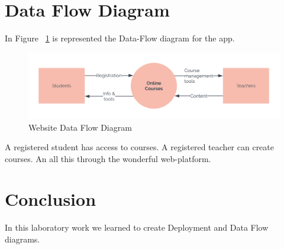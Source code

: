 \documentclass[12pt,a4paper,titlepage]{article}
\begin{document}
\section{Data Flow Diagram}
In Figure ~\ref{fig:data} is represented the Data-Flow diagram for the app.
\begin{figure}[H]
\centering
	\includegraphics[width=15cm]{data}
	\caption{Website Data Flow Diagram}
	\label{fig:data}
\end{figure}
A registered student has access to courses. A registered teacher can create courses. An all this through the wonderful web-platform.

\section{Conclusion}
In this laboratory work we learned to create Deployment and Data Flow diagrams.

\clearpage
\cleardoublepage
\end{document}
